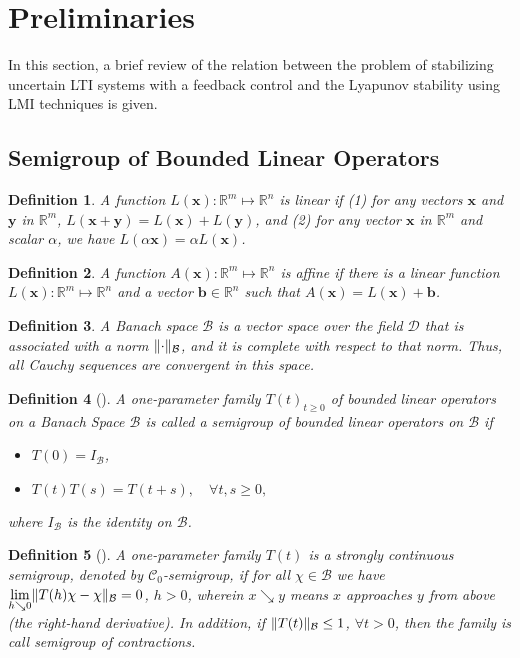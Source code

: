 \documentclass[journal]{IEEEtran}
\newtheorem{defn}{Definition}
\DeclarePairedDelimiter{\norm}{\lVert}{\rVert}
\begin{document}
\section{Preliminaries} \label{sect:sect2}
In this section, a brief review of the relation between the problem of stabilizing uncertain LTI systems with a feedback control and the Lyapunov stability using LMI techniques is given.

\subsection{Semigroup of Bounded Linear Operators}
\begin{defn}
	A function $ L(\mathbf x) : \mathbb R^m \mapsto \mathbb R^n $ is linear if (1) for any vectors $ \mathbf x $ and $ \mathbf y $ in $ \mathbb R^ m $, $ L(\mathbf x+ \mathbf y) = L( \mathbf x) +L( \mathbf y) $, and (2) for any vector $ \mathbf x $ in $ \mathbb R^ m $ and scalar $ \alpha $, we have $ L(\alpha\mathbf x) = \alpha L(\mathbf x) $.
\end{defn}
\begin{defn}
	A function $ A(\mathbf x) : \mathbb R^m \mapsto \mathbb R^n $ is affine if there is a linear function $ L(\mathbf x) : \mathbb R^m \mapsto \mathbb R^n $ and a vector $ \mathbf b \in \mathbb R^n $ such that $ A(\mathbf x) = L(\mathbf x) + \mathbf b $.
\end{defn}
\begin{defn}
	A Banach space $ \mathcal B $ is a vector space over the field $ \mathcal D $ that is associated with a norm $ \norm{\cdot}_{\mathcal B} $, and it is complete with respect to that norm. Thus, all Cauchy sequences are convergent in this space.
\end{defn}
\begin{defn}[{\cite[Definition 1.1]{Pazy2012semigroups}}]
	A one-parameter family $ T(t) _{t\geq0} $ of bounded linear operators on a Banach Space $ \mathcal B $ is called a semigroup of bounded linear operators on $ \mathcal B $ if
	\begin{itemize}
		\item $T(0) =   I _{\mathcal B}$,
		\item $T(t)T(s) = T(t+s), \quad  \forall t,s \geq 0 ,$
	\end{itemize}
	where $  I_{\mathcal B}$ is the identity on $ \mathcal B $.
\end{defn}
\begin{defn}[{\cite[Section 7.1]{Hale2013introduction}}]
	A one-parameter family $ T(t) $ is a \textit{strongly continuous semigroup}, denoted by $ \mathcal C_0 $-semigroup, if for all $\chi \in \mathcal B $ we have $ \lim\limits_{h\searrow 0} \norm{T(h) \chi-\chi}_{\mathcal B}=0$, $ h>0 $, wherein $ x\searrow y $ means $ x $ approaches $ y $ from above (the right-hand derivative). In addition, if $ \norm{T(t)}_{\mathcal B} \leq 1 $, $ \forall t>0 $, then the family is call semigroup of \textit{contractions}.
\end{defn}
\end{document}
